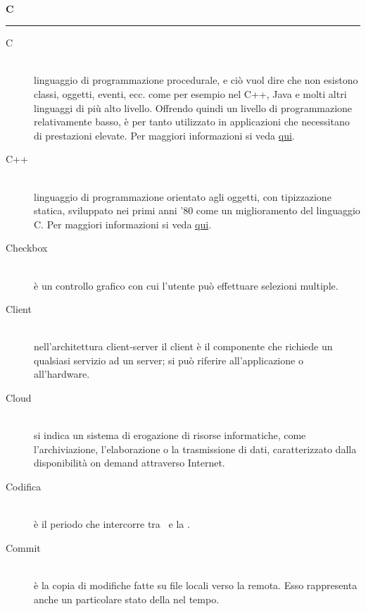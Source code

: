 \documentclass[12pt,a4paper]{article}
\begin{document}
\newpage

\begin{center}
\hfill\\
	\LARGE \textbf{C}
\hfill\\
\rule[15pt]{30pt}{0.5pt}
\end{center}

\begin{description}
\item[C]
\hfill\\ linguaggio di programmazione procedurale, e ciò vuol dire che non esistono classi, oggetti, eventi, ecc. come per esempio nel C++, Java e molti altri linguaggi di più alto livello. Offrendo quindi un livello di programmazione relativamente basso, è per tanto utilizzato in applicazioni che necessitano di prestazioni elevate. Per maggiori informazioni si veda \href{https://it.wikiversity.org/wiki/Linguaggio_C}{qui}.

\item[C++]
\hfill\\ linguaggio di programmazione orientato agli oggetti, con tipizzazione statica, sviluppato nei primi anni '80 come un miglioramento del linguaggio C. Per maggiori informazioni si veda \href{https://it.wikiversity.org/wiki/C\%2B\%2B}{qui}.

\item[Checkbox]
\hfill\\ è un controllo grafico con cui l'utente può effettuare selezioni multiple.

\item[Client]
\hfill\\nell'architettura client-server il client è il componente che richiede un qualsiasi servizio ad un server; si può riferire all'applicazione o all'hardware.

\item[Cloud]
\hfill\\ si indica un sistema di erogazione di risorse informatiche, come l'archiviazione, l'elaborazione o la trasmissione di dati, caratterizzato dalla disponibilità on demand attraverso Internet.

\item[Codifica] 
\hfill\\ è il periodo che intercorre tra \RP\ e la \RQ.

\item[Commit] 
\hfill\\ è la copia di modifiche fatte su file locali verso la  remota. Esso rappresenta anche un particolare stato della  nel tempo.


\end{description}
\end{document}
